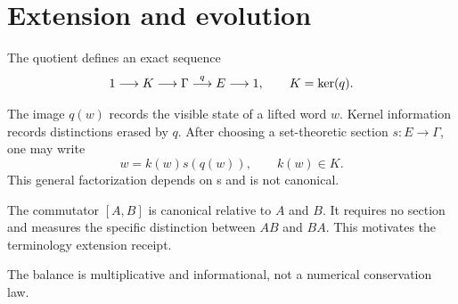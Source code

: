 \section{Extension and evolution}

The quotient defines an exact sequence
\[
1\longrightarrow K\longrightarrow\Gamma
\overset{q}{\longrightarrow}E\longrightarrow1,
\qquad K=\operatorname{ker}(q).
\]

The image \(q(w)\) records the visible state of a lifted word \(w\).
Kernel information records distinctions erased by \(q\). After choosing
a set-theoretic section \(s:E\to\Gamma\), one may write
\[
w=k(w)s(q(w)),
\qquad k(w)\in K.
\]
This general factorization depends on s and is not canonical.

The commutator \([A,B]\) is canonical relative to \(A\) and \(B\). It
requires no section and measures the specific distinction between
\(AB\) and \(BA\).
This motivates the terminology extension receipt.

The balance is multiplicative and informational, not a numerical
conservation law.
